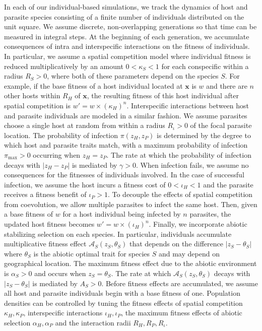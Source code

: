 \documentclass{article}
\begin{document}
In each of our individual-based simulations, we track the dynamics of
host and parasite species consisting of a finite number of individuals
distributed on the unit square. We assume discrete, non-overlapping
generations so that time can be measured in integral steps. At the
beginning of each generation, we accumulate consequences of intra and
interspecific interactions on the fitness of individuals. In particular,
we assume a spatial competition model where individual fitness is
reduced multiplicatively by an amount \(0<\kappa_S<1\) for each
conspecific within a radius \(R_S>0\), where both of these parameters
depend on the species \(S\). For example, if the base fitness of a host
individual located at \(\pmb x\) is \(w\) and there are \(n\) other
hosts within \(R_H\) of \(\pmb x\), the resulting fitness of this host
individual after spatial competition is \(w'=w\times(\kappa_H)^n\).
Interspecific interactions between host and parasite individuals are
modeled in a similar fashion. We assume parasites choose a single host
at random from within a radius \(R_\iota>0\) of the focal parasite
location. The probability of infection \(\pi(z_H,z_P)\) is determined by
the degree to which host and parasite traits match, with a maximum
probability of infection \(\pi_{\max}>0\) occurring when \(z_H=z_P\).
The rate at which the probability of infection decays with \(|z_H-z_P|\)
is mediated by \(\gamma>0\). When infection fails, we assume no
consequences for the fitnesses of individuals involved. In the case of
successful infection, we assume the host incurs a fitness cost of
\(0<\iota_H<1\) and the parasite receives a fitness benefit of
\(\iota_P>1\). To decouple the effects of spatial competition from
coevolution, we allow multiple parasites to infect the same host. Then,
given a base fitness of \(w\) for a host individual being infected by
\(n\) parasites, the updated host fitness becomes
\(w'=w\times(\iota_H)^n\). Finally, we incorporate abiotic stabilizing
selection on each species. In particular, individuals accumulate
multiplicative fitness effect \(\mathcal A_S(z_S,\theta_S)\) that
depends on the difference \(|z_S-\theta_S|\) where \(\theta_S\) is the
abiotic optimal trait for species \(S\) and may depend on geographical
location. The maximum fitness effect due to the abiotic environment is
\(\alpha_S>0\) and occurs when \(z_S=\theta_S\). The rate at which
\(\mathcal A_S(z_S,\theta_S)\) decays with \(|z_S-\theta_S|\) is
mediated by \(A_S>0\). Before fitness effects are accumulated, we assume
all host and parasite individuals begin with a base fitness of one.
Population densities can be controlled by tuning the fitness effects of
spatial competition \(\kappa_H,\kappa_P\), interspecific interactions
\(\iota_H,\iota_P\), the maximum fitness effects of abiotic selection
\(\alpha_H,\alpha_P\) and the interaction radii \(R_H,R_P,R_\iota\).
\end{document}
